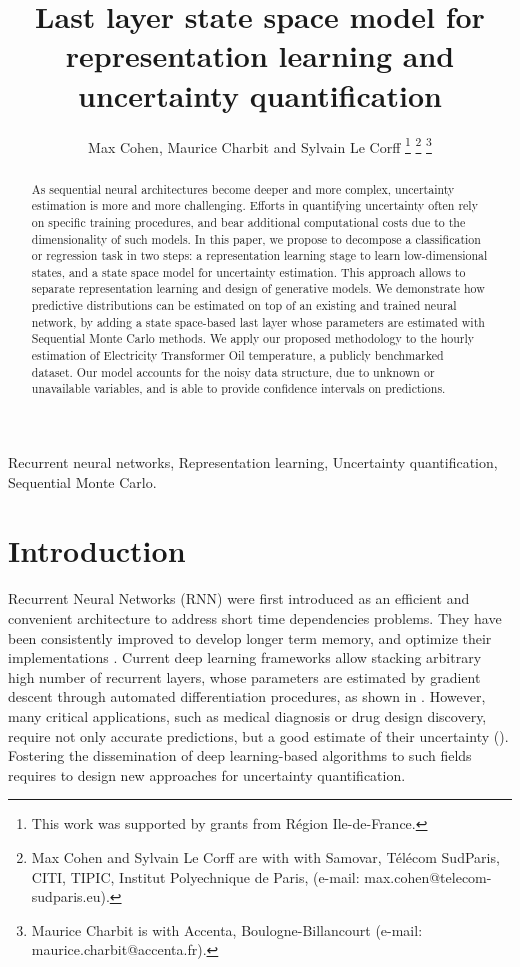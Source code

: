 \documentclass[journal]{IEEEtran}
\title{Last layer state space model for representation learning and uncertainty quantification}
\author{Max Cohen, Maurice Charbit and Sylvain Le Corff
	\thanks{This work was supported by grants from Région Ile-de-France.}
	\thanks{Max Cohen and Sylvain Le Corff are with with Samovar, T\'el\'ecom SudParis, CITI, TIPIC, Institut Polyechnique de Paris, (e-mail: max.cohen@telecom-sudparis.eu).}
	\thanks{Maurice Charbit is with Accenta, Boulogne-Billancourt (e-mail: maurice.charbit@accenta.fr).}}
\begin{document}
\maketitle
\begin{abstract}
	As sequential neural architectures become deeper and more complex, uncertainty estimation is more and more challenging.
	Efforts in quantifying uncertainty often rely on specific training procedures, and bear additional computational costs due to the dimensionality of such models.
	In this paper, we propose to decompose a classification or regression task in two steps: a representation learning stage to learn low-dimensional states, and a state space model for uncertainty estimation.
	This approach allows to separate representation learning and design of generative models.
	We demonstrate how predictive distributions can be estimated on top of an existing and trained neural network, by adding a state space-based last layer whose parameters are estimated with Sequential Monte Carlo methods.
	We apply our proposed methodology to the hourly estimation of Electricity Transformer Oil temperature, a publicly benchmarked dataset.
	Our model accounts for the noisy data structure, due to unknown or unavailable variables, and is able to provide confidence intervals on predictions.
\end{abstract}

\begin{IEEEkeywords}
	Recurrent neural networks, Representation learning, Uncertainty quantification, Sequential Monte Carlo.
\end{IEEEkeywords}

\section{Introduction}
\label{sec:intro}

Recurrent Neural Networks (RNN) were first introduced as an efficient and convenient architecture to address short time dependencies problems.
They have been consistently improved to develop longer term memory, and optimize their implementations \cite{Bengio1994LearningLD,Hochreiter1997LongSM}. %
Current deep learning frameworks allow stacking arbitrary high number of recurrent layers, whose parameters are estimated by gradient descent through automated differentiation procedures, as shown in \cite{Graves2013SpeechRecognition}.
However, many critical applications, such as medical diagnosis or drug design discovery, require not only accurate predictions, but a good estimate of their uncertainty (\cite{Crowson2016AssessingCalibration, Mervin2020UncertaintyQuantification}).
Fostering the dissemination of deep learning-based algorithms to such fields requires to design new approaches for uncertainty quantification.
\end{document}
